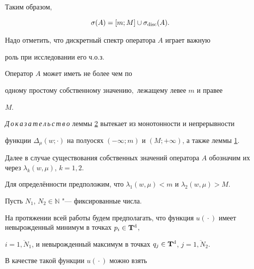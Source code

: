 Таким образом,

$$

\sigma(A)=[m; M] \cup \sigma_{\rm disc}(A).

$$



Надо отметить, что дискретный спектр оператора $A$ играет важную

роль при исследовании его ч.о.з.



\smallskip



\hypertarget{RD:lemma2}{}



\begin{lemma}[2] Оператор $A$ может иметь не более чем по

одному простому собственному значению$,$ лежащему левее $m$ и правее

$M.$

\end{lemma}



\smallskip



{\it Д\,о\,к\,а\,з\,а\,т\,е\,л\,ь\,с\,т\,в\,о\/} леммы \hyperlink{RD:lemma2}{2} вытекает из монотонности и непрерывности

функции $\Delta_{ \mu}(w; \cdot)$ на полуосях $(-\infty; m)$ и $(M; +\infty)$, а также леммы \hyperlink{RD:lemma1}{1}.



\smallskip



Далее в случае существования собственных значений оператора $A$ обозначим их через $\lambda_k(w, \mu)$, $k=1, 2$. 

Для определённости предположим, что $\lambda_1(w, \mu) < m$ и $\lambda_2(w, \mu)>M$.



Пусть $N_1$, $N_2 \in {\mathbb N}$ "--- фиксированные числа. 

На протяжении всей работы будем предполагать, что функция $u({}\cdot{})$ имеет невырожденный минимум в точках $p_i \in {\bf T}^{\rm d}$,

$i=\overline{1,N_1}$, и невырожденный максимум в точках $q_j \in

{\bf T}^{\rm d}$, $j=\overline{1,N_2}$.



В качестве такой функции $u({}\cdot{})$ можно взять

